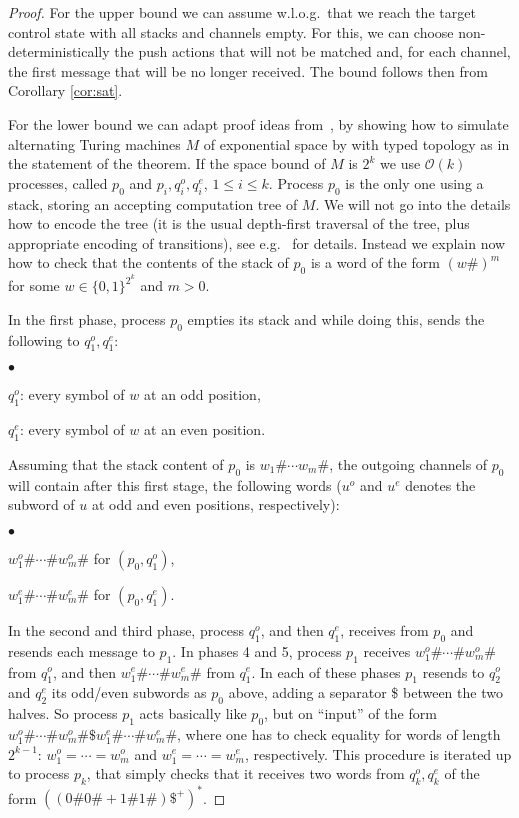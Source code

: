 \documentclass{LMCS}
\begin{document}
\begin{proof}
  For the upper bound we can assume w.l.o.g.~that we reach the target
  control state with all stacks and channels empty. For this, we
  can choose non-deterministically the push actions that will not be
  matched and, for each channel, the first message that will be no
  longer received. The bound follows then from Corollary
  \ref{cor:sat}.

  For the lower bound we can adapt proof ideas
  from~\cite{atig-f-2008-121-a,latorre-s-2008-33-a}, by showing how
  to simulate alternating Turing machines $M$ of exponential space by
  \rqcp with typed topology as in the statement of the theorem. If the
  space bound of $M$ is $2^k$ we use $\mathcal{O}(k)$ processes,
  called $p_0$ and $p_i, q^o_i,q^e_i$, $1 \le i \le k$. Process $p_0$
  is the only one using a stack, storing an accepting computation tree
  of $M$. We will not go into the details how to encode the tree (it
  is the usual depth-first traversal of the tree, plus appropriate
  encoding of transitions), see e.g.~\cite{atig-f-2008-121-a} for
  details. Instead we explain now how to check that the contents of
  the stack of $p_0$ is a word of the form $(w\#)^m$ for some $w \in \{0,1\}^{2^k}$ and $m >0$. 

In the first phase, process $p_0$ empties its stack and while doing
this, sends the following to $q^o_1,q^e_1$:
\begin{iteMize}{$\bullet$}
\item $q^o_1$: every symbol of $w$ at an odd position,
\item $q^e_1$: every symbol of $w$ at an even position.
\end{iteMize}
Assuming that the stack content of $p_0$ is $w_1 \# \cdots w_m \#$,
the outgoing channels of $p_0$ will contain after this first stage,
the following words ($u^o$ and $u^e$ denotes
the subword  of $u$ at odd and even positions, respectively):
\begin{iteMize}{$\bullet$}
\item $w_1^o \# \cdots \# w_m^o\#$  for $(p_0,q^o_1)$,
\item $w_1^e \# \cdots \# w_m^e\#$ for $(p_0,q^e_1)$.
\end{iteMize}
In the second and third phase, process $q^o_1$, and then $q^e_1$,
receives from $p_0$ and resends each message to $p_1$. In phases 4 and
5, process $p_1$ receives $w_1^o \# \cdots \# w_m^o\#$ from $q^o_1$,
and then $w_1^e \# \cdots \# w_m^e\#$ from $q^e_1$. In each of these
phases $p_1$ resends to $q^o_2$ and $q^e_2$ its odd/even subwords as
$p_0$ above, adding a separator \$ between the two halves. So process
$p_1$ acts basically like $p_0$, but on ``input'' of the form $w_1^o \# \cdots
\# w_m^o\# \$ w_1^e \# \cdots \# w_m^e\#$, where one has to check
equality for words of length $2^{k-1}$: $w_1^o=\cdots=w_m^o$ and
$w_1^e=\cdots=w_m^e$, respectively. This procedure is iterated up to
process $p_k$, that simply checks that it receives two words from
$q^o_k,q^e_k$ of the form
$((0\#0\# +1 \#1\#)\$^+)^*$.


\end{proof}
\end{document}
